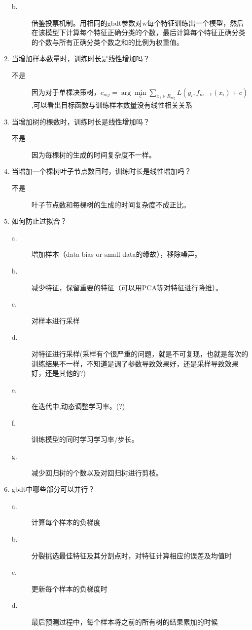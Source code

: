 \documentclass[UTF8]{article}%
\begin{document}
\begin{enumerate}
\begin{description}
					\item[b.] 借鉴投票机制。用相同的gbdt参数对w每个特征训练出一个模型，然后在该模型下计算每个特征正确分类的个数，最后计算每个特征正确分类的个数与所有正确分类个数之和的比例为权重值。
				\end{description}
				\item 当增加样本数量时，训练时长是线性增加吗？
				\begin{description}
					\item[不是] 因为对于单棵决策树，$c_{mj}=\arg \min \limits_{c} \sum_{x_j \in R_{mj}}L(y_i,f_{m-1}(x_i)+c)$,可以看出目标函数与训练样本数量没有线性相关关系
				\end{description}
				\item 当增加树的棵数时，训练时长是线性增加吗？
				\begin{description}
					\item[不是] 因为每棵树的生成的时间复杂度不一样。
				\end{description}
				\item 当增加一个棵树叶子节点数目时，训练时长是线性增加吗？
				\begin{description}
					\item[不是] 叶子节点数和每棵树的生成的时间复杂度不成正比。
				\end{description}
				\item 如何防止过拟合？
				\begin{description}
					\item[a.] 增加样本（data bias or small data的缘故），移除噪声。
					\item[b.] 减少特征，保留重要的特征（可以用PCA等对特征进行降维）。
					\item[c.] 对样本进行采样
					\item[d.] 对特征进行采样(采样有个很严重的问题，就是不可复现，也就是每次的训练结果不一样，不知道是调了参数导致效果好，还是采样导致效果好，还是其他的?)
					\item[e.] 在迭代中,动态调整学习率。(?)
					\item[f.] 训练模型的同时学习学习率/步长。
					\item[g.] 减少回归树的个数以及对回归树进行剪枝。
				\end{description}
				\item gbdt中哪些部分可以并行？
				\begin{description}
					\item[a.] 计算每个样本的负梯度
					\item[b.] 分裂挑选最佳特征及其分割点时，对特征计算相应的误差及均值时
					\item[c.] 更新每个样本的负梯度时
					\item[d.] 最后预测过程中，每个样本将之前的所有树的结果累加的时候
				\end{description}

			\end{enumerate}
\end{document}
